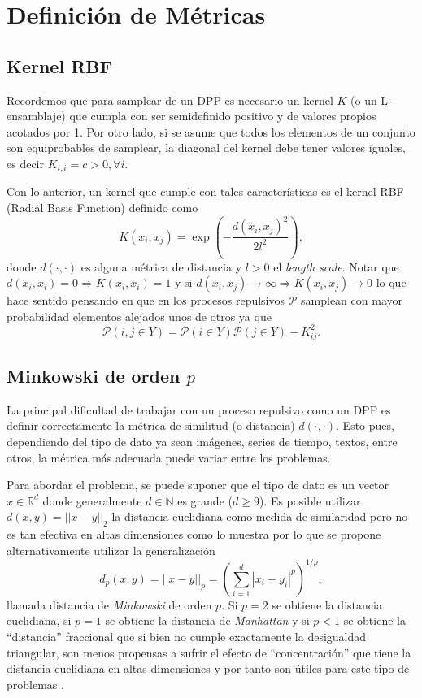 \section{Definición de Métricas}


\subsection{Kernel RBF}

Recordemos que para samplear de un DPP es necesario un kernel $K$ (o un L-ensamblaje) que cumpla con ser semidefinido positivo y de valores propios acotados por 1. Por otro lado, si se asume que todos los elementos de un conjunto son equiprobables de samplear, la diagonal del kernel debe tener valores iguales, es decir $K_{i,i} = c > 0 , \forall i$.

\vspace{0.2cm}

Con lo anterior, un kernel que cumple con tales características es el kernel RBF (Radial Basis Function) \cite{article2} definido como 
\[
K(x_i, x_j) = \exp \left ( - \frac{d(x_i,x_j)^2}{2l^2}\right ) , 
\]
donde $d(\cdot,\cdot)$ es alguna métrica de distancia y $l>0$ el \textit{length scale}. Notar que $d(x_i, x_i) = 0 \Rightarrow K(x_i,x_i) = 1$ y si $d(x_i , x_j) \rightarrow \infty \Rightarrow K(x_i,x_j) \rightarrow 0$ lo que hace sentido pensando en que en los procesos repulsivos $\mathcal{P}$ samplean con mayor probabilidad elementos alejados unos de otros ya que 
\[
\mathcal{P}(i,j \in Y) = \mathcal{P}(i \in Y)\mathcal{P}(j \in Y) - K_{ij}^2 .
\]

\subsection{Minkowski de orden $p$}\label{section:minkowski}

La principal dificultad de trabajar con un proceso repulsivo como un DPP es definir correctamente la métrica de similitud (o distancia) $d(\cdot,\cdot)$. Esto pues, dependiendo del tipo de dato ya sean imágenes, series de tiempo, textos, entre otros, la métrica más adecuada puede variar entre los problemas. 

\vspace{0.2cm}

Para abordar el problema, se puede suponer que el tipo de dato es un vector $x \in \mathbb{R}^d$ donde generalmente $d \in \mathbb{N}$ es grande ($d\geq9$). Es posible utilizar $d(x,y) = ||x-y||_2$ la distancia euclidiana como medida de similaridad pero no es tan efectiva en altas dimensiones como lo muestra \cite{https://doi.org/10.1002/sam.11161} por lo que se propone alternativamente utilizar la generalización
\[
d_p(x,y) = ||x-y||_p = \left (\sum_{i=1}^d |x_i-y_i|^p\right)^{1/p}, 
\]
llamada distancia de \textit{Minkowski} de orden $p$. Si $p=2$ se obtiene la distancia euclidiana, si $p=1$ se obtiene la distancia de \textit{Manhattan} y si $p<1$ se obtiene la ``distancia'' fraccional que si bien no cumple exactamente la desigualdad triangular, son menos propensas a sufrir el efecto de ``concentración'' que tiene la distancia euclidiana en altas dimensiones y por tanto son útiles para este tipo de problemas \cite{10.1007/3-540-44503-X_27}. 


